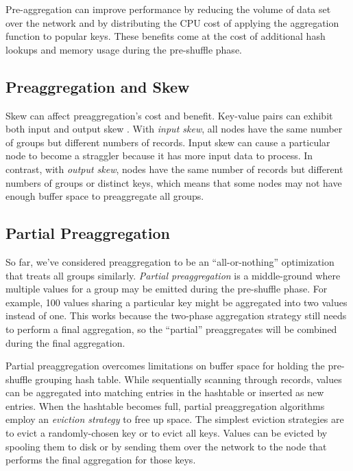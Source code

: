 \documentclass[12pt]{article}
\begin{document}
Pre-aggregation can improve performance by reducing the volume of data set over the network and by distributing the CPU cost of applying the aggregation function to popular keys.
These benefits come at the cost of additional hash lookups and memory usage during the pre-shuffle phase.

\subsection{Preaggregation and Skew}

Skew can affect preaggregation's cost and benefit.  Key-value pairs can exhibit both input and output skew \cite{adaptive-aggregation}.
With \emph{input skew}, all nodes have the same number of groups but different numbers of records.  Input skew can cause a particular node to become a straggler because it has more input data to process.  In contrast, with \emph{output skew}, nodes have the same number of records but different numbers of groups or distinct keys, which means that some nodes may not have enough buffer space to preaggregate all groups.

\subsection{Partial Preaggregation}

So far, we've considered preaggregation to be an ``all-or-nothing'' optimization that treats all groups similarly.
\emph{Partial preaggregation} \cite{partial-preaggregation} is a middle-ground where multiple values for a group may be emitted during the pre-shuffle phase.  For example, 100 values sharing a particular key might be aggregated into two values instead of one.
This works because the two-phase aggregation strategy still needs to perform a final aggregation, so the ``partial'' preaggregates will be combined during the final aggregation.

Partial preaggregation overcomes limitations on buffer space for holding the pre-shuffle grouping hash table.
While sequentially scanning through records, values can be aggregated into matching entries in the hashtable or inserted as new entries.
When the hashtable becomes full, partial preaggregation algorithms employ an \emph{eviction strategy} to free up space.
The simplest eviction strategies are to evict a randomly-chosen key or to evict all keys.
Values can be evicted by spooling them to disk or by sending them over the network to the node that performs the final aggregation for those keys.
\end{document}
